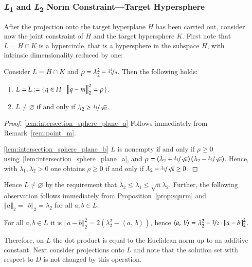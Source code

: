 \documentclass[twoside,11pt]{article}
\newcommand{\0}{\mathcal{O}}
\newcommand{\norm}[1]{\left\Vert#1\right\Vert}
\newcommand{\scp}[2]{\left<#1,\ #2\right>}
\renewcommand{\emptyset}{\varnothing}
\begin{document}
\subsubsection{\textit{L}\textsubscript{1} and \textit{L}\textsubscript{2} Norm Constraint---Target Hypersphere}
\label{sect:l2nrmcnstrnt}
After the projection onto the target hyperplane $H$ has been carried out, consider now the joint constraint of $H$ and the target hypersphere $K$.
First note that $L = H\cap K$ is a hypercircle, that is a hypersphere in the subspace $H$, with intrinsic dimensionality reduced by one:
\begin{lemma}
\label{lem:intersection_sphere_plane}
Consider $L = H\cap K$ and $\rho = \lambda_2^2 - \nicefrac{\lambda_1^2}{n}$.
Then the following holds:
\begin{enumerate}
\item \label{lem:intersection_sphere_plane_a}
$L = \tilde{L} := \set{q\in H | \norm{q - m}_2^2 = \rho}$.

\item \label{lem:intersection_sphere_plane_b}
$L\neq\emptyset$ if and only if $\lambda_2 \geq \nicefrac{\lambda_1}{\sqrt{n}}$.
\end{enumerate}
\end{lemma}
\begin{proof}
\ref{lem:intersection_sphere_plane_a}
Follows immediately from Remark~\ref{rem:point_m}.

\ref{lem:intersection_sphere_plane_b}
$L$ is nonempty if and only if $\rho\geq 0$ using~\ref{lem:intersection_sphere_plane_a},
and $\rho = \left(\lambda_2 + \nicefrac{\lambda_1}{\sqrt{n}}\right)\left(\lambda_2 - \nicefrac{\lambda_1}{\sqrt{n}}\right)$.
Hence, with $\lambda_1,\lambda_2 > 0$ one obtains $\rho\geq 0$ if and only if $\lambda_2 - \nicefrac{\lambda_1}{\sqrt{n}} \geq 0$.
\end{proof}
Hence $L\neq\emptyset$ by the requirement that $\lambda_2 \leq \lambda_1 \leq \sqrt{n}\lambda_2$.
Further, the following observation follows immediately from Proposition~\ref{prop:sqnrm} and $\norm{a}_2 = \norm{b}_2 = \lambda_2$ for all $a,b\in L$:
\begin{remark}
\label{rem:scpinL}
For all $a,b\in L$ it is $\norm{a - b}_2^2 = 2\left(\lambda_2^2 - \scp{a}{b}\right)$, hence $\scp{a}{b} = \lambda_2^2 - \nicefrac{1}{2}\cdot\norm{a - b}_2^2$.
\end{remark}
Therefore, on $L$ the dot product is equal to the Euclidean norm up to an additive constant.
Next consider projections onto $L$ and note that the solution set with respect to $D$ is not changed by this operation.
\end{document}
